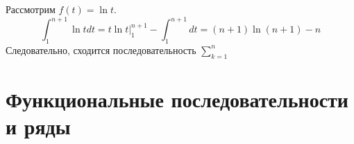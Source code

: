 
Рассмотрим \(f(t) = \ln t\).
\[\int_1^{n + 1} \ln tdt = t\ln t|_{1}^{n + 1} - \int_1^{n + 1}dt = (n + 1)\ln(n + 1) - n\]
Следовательно, сходится последовательность \(\sum_{k = 1}^n\)


\section{Функциональные последовательности и ряды}
